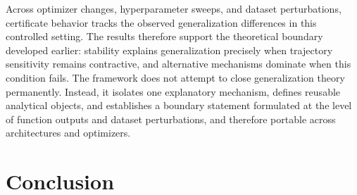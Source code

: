 \documentclass{article}
\numberwithin{equation}{section}
\begin{document}
Across optimizer changes, hyperparameter sweeps, and dataset perturbations, certificate behavior tracks the observed generalization differences in this controlled setting. The results therefore support the theoretical boundary developed earlier: stability explains generalization precisely when trajectory sensitivity remains contractive, and alternative mechanisms dominate when this condition fails. The framework does not attempt to close generalization theory permanently. Instead, it isolates one explanatory mechanism, defines reusable analytical objects, and establishes a boundary statement formulated at the level of function outputs and dataset perturbations, and therefore portable across architectures and optimizers.

\section{Conclusion}
\label{sec:conclusion}
\end{document}
